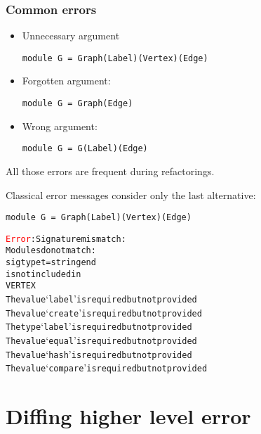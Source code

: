\documentclass[a4paper,11pt]{beamer}
\newcommand{\error}[1]{\textcolor{red}{#1}}
\begin{document}
\begin{frame}[fragile]\frametitle{Common errors}

  \begin{itemize}
    \item{Unnecessary argument
\begin{verbatim}
module G = Graph(Label)(Vertex)(Edge)
\end{verbatim}
      }
    \item{Forgotten argument:
\begin{verbatim}
module G = Graph(Edge)
\end{verbatim}
      }
    \item{Wrong argument:
\begin{verbatim}
module G = G(Label)(Edge)
\end{verbatim}
      }
\end{itemize}

All those errors are frequent during refactorings.

\end{frame}

\begin{frame}[fragile]
Classical error messages consider only the last alternative:

\begin{verbatim}
module G = Graph(Label)(Vertex)(Edge)
\end{verbatim}

\begin{alltt}
\error{Error}: Signature mismatch:
       Modules do not match:
         sig type t = string end
       is not included in
         VERTEX
       The value `label' is required but not provided
       The value `create' is required but not provided
       The type `label' is required but not provided
       The value `equal' is required but not provided
       The value `hash' is required but not provided
       The value `compare' is required but not provided
 \end{alltt}
\end{frame}


\section{Diffing higher level error}
\end{document}
